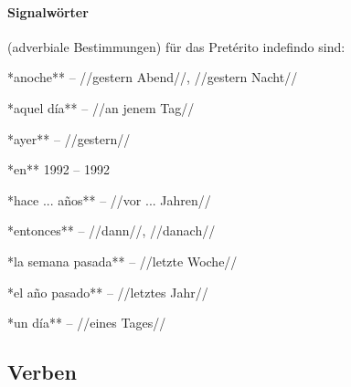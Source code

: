 \paragraph{Signalwörter} (adverbiale Bestimmungen) für das Pretérito indefindo sind:

\begin{compactitem}
    \item **anoche** -- //gestern Abend//, //gestern Nacht//
    \item **aquel día** -- //an jenem Tag//
    \item **ayer** -- //gestern//
    \item **en** 1992 -- 1992
    \item **hace ... años** -- //vor ... Jahren//
    \item **entonces** -- //dann//, //danach//
    \item **la semana pasada** -- //letzte Woche//
    \item **el año pasado** -- //letztes Jahr//
    \item **un día** -- //eines Tages//
\end{compactitem}

\subsection*{Verben}

